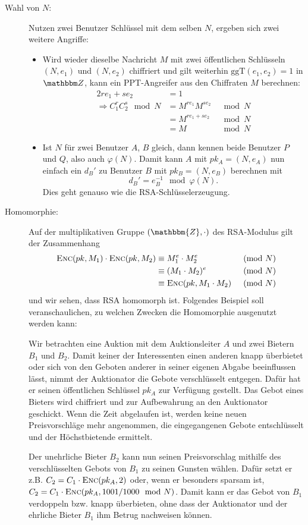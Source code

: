 \begin{description}
\item[Wahl von $N$:] Nutzen zwei Benutzer Schlüssel mit dem selben $N$,
  ergeben sich zwei weitere Angriffe:
  \begin{itemize}
  \item Wird wieder dieselbe Nachricht $M$ mit zwei öffentlichen
    Schlüsseln $(N, e_1)$ und $(N, e_2)$ chiffriert und gilt weiterhin
    $\text{ggT}(e_1, e_2) = 1$ in $\Z{}$, kann ein PPT-Angreifer aus den
    Chiffraten $M$ berechnen:
    \begin{alignat*}{2} re_1 + se_2 & = 1\\ \Longrightarrow C_1^rC_2^s
      \mod N &= M^{re_1}M^{se_2} &\mod N\\ &= M^{re_1 + se_2} &\mod N\\ &= M
      &\mod N
    \end{alignat*}
  \item Ist $N$ für zwei Benutzer $A$, $B$ gleich, dann kennen beide
    Benutzer $P$ und $Q$, also auch $\varphi(N)$. Damit kann $A$ mit $pk_A =
    (N, e_A)$ nun einfach ein $d_B'$ zu Benutzer $B$ mit $pk_B = (N, e_B)$
    berechnen mit
    \[d_B'=e_B^{-1} \mod \varphi(N).\] Dies geht genauso wie die
    RSA-Schlüsselerzeugung.
  \end{itemize}
\item[Homomorphie:]\indexRSAHomomorphie Auf der multiplikativen Gruppe
  $(\mathbbm{Z}, \cdot)$ des RSA-Modulus gilt der Zusammenhang
  \begin{alignat*}{2} \textsc{Enc}(pk, M_1) \cdot \textsc{Enc}(pk, M_2) &\equiv M_1^e
    \cdot M_2^e & \pmod N \\ &\equiv (M_1 \cdot M_2)^e & \pmod N\\ &\equiv
    \textsc{Enc}(pk, M_1 \cdot M_2) & \pmod N
  \end{alignat*} und wir sehen, dass RSA homomorph ist.  Folgendes
  Beispiel soll veranschaulichen, zu welchen Zwecken die Homomorphie
  ausgenutzt werden kann:
  \begin{beispiel} Wir betrachten eine Auktion mit dem Auktionsleiter
    $A$ und zwei Bietern $B_1$ und $B_2$. Damit keiner der Interessenten
    einen anderen knapp überbietet oder sich von den Geboten anderer in
    seiner eigenen Abgabe beeinflussen lässt, nimmt der Auktionator die
    Gebote verschlüsselt entgegen. Dafür hat er seinen öffentlichen
    Schlüssel $pk_A$ zur Verfügung gestellt. Das Gebot eines Bieters wird
    chiffriert und zur Aufbewahrung an den Auktionator geschickt. Wenn die
    Zeit abgelaufen ist, werden keine neuen Preisvorschläge mehr angenommen,
    die eingegangenen Gebote entschlüsselt und der Höchstbietende ermittelt.
    
    Der unehrliche Bieter $B_2$ kann nun seinen Preisvorschlag
    mithilfe des verschlüsselten Gebots von $B_1$ zu seinen Gunsten
    wählen. Dafür setzt er z.B. $C_2 = C_1 \cdot \textsc{Enc}({pk_A, 2})$ oder, wenn
    er besonders sparsam ist, $C_2 = C_1 \cdot \textsc{Enc}({pk_A, 1001/1000 \mod
      N})$. Damit kann er das Gebot von $B_1$ verdoppeln bzw. knapp
    überbieten, ohne dass der Auktionator und der ehrliche Bieter $B_1$ ihm
    Betrug nachweisen können.
  \end{beispiel}
\end{description}


